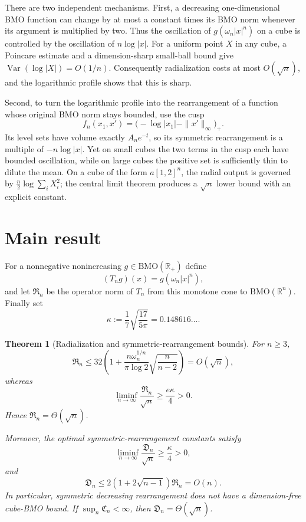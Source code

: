 \documentclass[11pt]{article}
\newtheorem{theorem}{Theorem}
\newcommand{\R}{\mathbb R}
\newcommand{\BMO}{\mathrm{BMO}}
\newcommand{\1}{\mathbf 1}
\begin{document}
There are two independent mechanisms.  First, a decreasing one-dimensional
BMO function can change by at most a constant times its BMO norm whenever its
argument is multiplied by two.  Thus the oscillation of
$g(\omega_n|x|^n)$ on a cube is controlled by the oscillation of
$n\log|x|$.  For a uniform point $X$ in any cube, a Poincare estimate and a
dimension-sharp small-ball bound give
$\operatorname{Var}(\log|X|)=O(1/n)$.  Consequently radialization costs at
most $O(\sqrt n)$, and the logarithmic profile shows that this is sharp.

Second, to turn the logarithmic profile into the rearrangement of a function
whose original BMO norm stays bounded, use the cusp
\[
 f_n(x_1,x')=\bigl(-\log|x_1|-\|x'\|_\infty\bigr)_+.
\]
Its level sets have volume exactly $A_ne^{-t}$, so its symmetric
rearrangement is a multiple of $-n\log|x|$.  Yet on small cubes the two
terms in the cusp each have bounded oscillation, while on large cubes the
positive set is sufficiently thin to dilute the mean.  On a cube of the form
$a[1,2]^n$, the radial output is governed by
$\frac n2\log\sum_i X_i^2$; the central limit theorem produces a
$\sqrt n$ lower bound with an explicit constant.

\section{Main result}

For a nonnegative nonincreasing $g\in\BMO(\R_+)$ define
\[
 (T_ng)(x)=g(\omega_n|x|^n),
\]
and let $\mathfrak R_n$ be the operator norm of $T_n$ from this monotone cone
to $\BMO(\R^n)$.  Finally set
\[
 \kappa:=\frac1{7}\sqrt{\frac{17}{5\pi}}=0.148616\ldots.
\]

\begin{theorem}[Radialization and symmetric-rearrangement bounds]
For $n\ge3$,
\begin{equation}\label{eq:Rupper}
 \mathfrak R_n\le
 32\left(1+\frac{n\omega_n^{1/n}}{\pi\log2}
             \sqrt{\frac n{n-2}}\right)=O(\sqrt n),
\end{equation}
whereas
\begin{equation}\label{eq:Rlower}
 \liminf_{n\to\infty}\frac{\mathfrak R_n}{\sqrt n}
 \ge \frac{e\kappa}{4}>0.
\end{equation}
Hence $\mathfrak R_n=\Theta(\sqrt n)$.

Moreover, the optimal symmetric-rearrangement constants satisfy
\begin{equation}\label{eq:Dlower}
 \liminf_{n\to\infty}\frac{\mathfrak D_n}{\sqrt n}
 \ge \frac{\kappa}{4}>0,
\end{equation}
and
\begin{equation}\label{eq:Dupper}
 \mathfrak D_n\le 2(1+2\sqrt{n-1})\mathfrak R_n=O(n).
\end{equation}
In particular, symmetric decreasing rearrangement does not have a
dimension-free cube-BMO bound.  If $\sup_n\mathfrak C_n<\infty$, then
$\mathfrak D_n=\Theta(\sqrt n)$.
\end{theorem}
\end{document}

